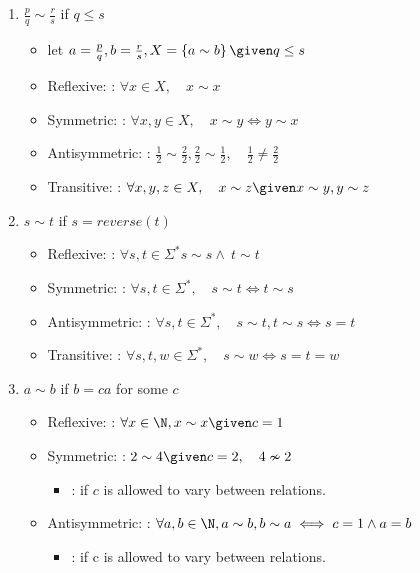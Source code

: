 \documentclass[basic, header]{nosvagor-notes}
\begin{document}
\begin{enumerate}[itemsep=5em]
\begin{enumerate}[itemsep=2.5em]
      \item $\frac p q  \sim \frac r s $ if $q \le s$
        \begin{itemize}
          \item let \(a = \frac{p}{q}, b = \frac{r}{s}, X = \left\{ a\sim b \right\}  \given q \leq s\)
          \item Reflexive: : \(\forall x \in X, \quad x \sim x\)
          \item Symmetric: : \(\forall x,y \in X, \quad x \sim y \iff y \sim x\)
          \item Antisymmetric: : \(\frac{1}{2} \sim \frac{2}{2}, \frac{2}{2} \sim \frac{1}{2}, \quad \frac{1}{2} \neq \frac{2}{2}\)
          \item Transitive: : \(\forall x,y,z \in X, \quad x \sim z \given x \sim y, y\sim z \)
        \end{itemize}

      \item $s \sim t$ if $s = reverse(t)$
        \begin{itemize}
          \item Reflexive: : \(\forall s,t \in \Sigma^* s\sim s \land~ t \sim t\)
          \item Symmetric: : \(\forall s,t \in \Sigma^*, \quad s \sim t \iff t \sim s\)
          \item Antisymmetric: : \(\forall s,t \in \Sigma^*, \quad s\sim t, t\sim s \iff s = t\)
          \item Transitive: : \(\forall s,t,w \in \Sigma^*, \quad  s \sim w \iff s = t = w\)
        \end{itemize}

      \item $a \sim b$ if $b = ca$ for some $c$
        \begin{itemize}
          \item Reflexive: : \(\forall x \in \N, x \sim x \given c = 1\)
          \item Symmetric: : \(2 \sim 4 \given c = 2, \quad 4 \nsim 2\)
            \begin{itemize}
              \item {}: if \(c\) is allowed to vary between relations.
            \end{itemize}

          \item Antisymmetric: : \(\forall a,b \in \N, a \sim b, b \sim a \iff c = 1 \land a = b\)
            \begin{itemize}
              \item {}: if c is allowed to vary between relations.
            \end{itemize}


\end{itemize}
\end{enumerate}
\end{enumerate}
\end{document}
